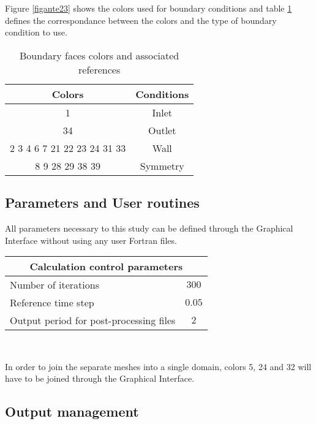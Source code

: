 Figure \ref{figante23} shows the colors used for boundary conditions and
table \ref{tabante21} defines the correspondance between the colors and
the type of boundary condition to use.

\begin{table}[htp]
\begin{center}
\begin{tabular}{|c|c|}
\hline
Colors & Conditions \\
\hline
1 & Inlet \\
\hline
34 & Outlet \\
\hline
2 3 4 6 7 21 22 23 24 31 33 & Wall \\
\hline
8 9 28 29 38 39 & Symmetry \\
\hline
\end{tabular}
\caption{Boundary faces colors and associated references}
\label{tabante21}
\end{center}
\end{table}


        \subsection{Parameters and User routines}

All parameters necessary to this study can be defined through the Graphical
Interface without using any user Fortran files.

\begin{center}
\begin{tabular}{|l|c|}
\hline
\multicolumn{2}{|c|}{Calculation control parameters} \\
\hline
Number of iterations & $300$ \\
\hline
Reference time step & $0.05$ \\
\hline
Output period for post-processing files& $2$ \\
\hline
\end{tabular}\\
\end{center}

In order to join the separate meshes into a single domain, colors 5, 24 and 32
will have to be joined through the Graphical Interface.



        \subsection{Output management}

